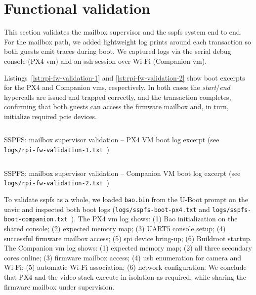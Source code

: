 \section{Functional validation}
\label{sec:functional-validation}
This section validates the mailbox supervisor and the \gls{sspfs} system end to end.
For the mailbox path, we added lightweight log prints around each transaction so
both guests emit traces during boot. We captured logs via the serial debug
console (PX4 \gls{vm}) and an \gls{ssh} session over Wi-Fi (Companion \gls{vm}).

Listings~\ref{lst:rpi-fw-validation-1} and \ref{lst:rpi-fw-validation-2} show
boot excerpts for the PX4 and Companion \glspl{vm}, respectively. In both cases
the \emph{start}/\emph{end} hypercalls are issued and trapped correctly, and the
transaction completes, confirming that both guests can access the firmware
mailbox and, in turn, initialize required \gls{pcie} devices.

\begin{longlisting}
\centering
\inputminted[]{text}{./listing/rpi-fw-validation-1.txt}
\caption[SSPFS: mailbox supervisor validation -- PX4 VM boot log (excerpt)]{SSPFS: mailbox supervisor validation -- PX4 VM boot log excerpt (see \texttt{logs/rpi-fw-validation-1.txt}~\cite{thesis-sw-github})}
\label{lst:rpi-fw-validation-1}
\end{longlisting}

\begin{longlisting}
\centering
\inputminted[]{text}{./listing/rpi-fw-validation-2.txt}
\caption[SSPFS: mailbox supervisor validation -- Companion VM boot log (excerpt)]{SSPFS: mailbox supervisor validation -- Companion VM boot log excerpt (see \texttt{logs/rpi-fw-validation-2.txt}~\cite{thesis-sw-github})}
\label{lst:rpi-fw-validation-2}
\end{longlisting}

To validate \gls{sspfs} as a whole, we loaded \lstinline{bao.bin} from the
U-Boot prompt on the \gls{uavic} and inspected both boot logs
(\lstinline{logs/sspfs-boot-px4.txt} and \lstinline{logs/sspfs-boot-companion.txt}~\cite{thesis-sw-github}).
The PX4 \gls{vm} log shows: (1) Bao initialization on the shared console; (2)
expected memory map; (3) UART5 console setup; (4) successful firmware mailbox
access; (5) \gls{spi} device bring-up; (6) Buildroot startup. The Companion
\gls{vm} log shows: (1) expected memory map; (2) all three secondary cores
online; (3) firmware mailbox access; (4) \gls{usb} enumeration for camera and
Wi-Fi; (5) automatic Wi-Fi association; (6) network configuration. We conclude
that PX4 and the video stack execute in isolation as required, while sharing the
firmware mailbox under supervision.

